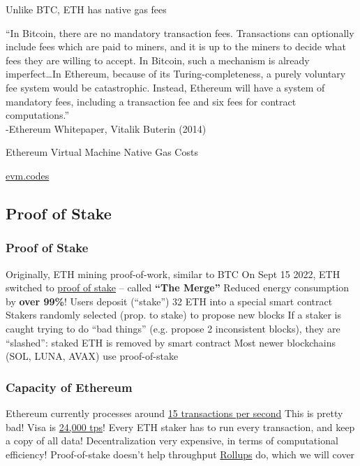 \documentclass[aspectratio=169]{beamer}
\begin{document}
\begin{frame}{Unlike BTC, ETH has native gas fees}

``In Bitcoin, there are no mandatory transaction fees. Transactions can optionally include fees which are paid to miners, and it is up to the miners to decide what fees they are willing to accept. In Bitcoin, such a mechanism is already imperfect\ldots In Ethereum, because of its Turing-completeness, a purely voluntary fee system would be catastrophic. Instead, Ethereum will have a system of mandatory fees, including a transaction fee and six fees for contract computations.'' \\

-Ethereum Whitepaper, Vitalik Buterin (2014)
    
\end{frame}


\begin{frame}{Ethereum Virtual Machine Native Gas Costs}

\vfill
\begin{center}
    \href{https://www.evm.codes/}{evm.codes}
\end{center}
\vfill
    
\end{frame}

\subsection{Proof of Stake}

\begin{frame}
\frametitle{Proof of Stake}

\bi
\m Originally, ETH mining proof-of-work, similar to BTC
\m On Sept 15 2022, ETH switched to \ul{proof of stake} -- called \textbf{``The Merge''}
\m Reduced energy consumption by \textbf{over 99\%}! 
\m Users deposit (``stake'') 32 ETH into a special smart contract
\m Stakers randomly selected (prop. to stake) to propose new blocks
\m If a staker is caught trying to do ``bad things'' (e.g. propose 2 inconsistent blocks), they are ``slashed'': staked ETH is removed by smart contract
\m Most newer blockchains (SOL, LUNA, AVAX) use proof-of-stake
\ei

\end{frame}

\begin{frame}
\frametitle{Capacity of Ethereum}

\bi
\m Ethereum currently processes around \href{https://www.coinbase.com/blog/scaling-ethereum-crypto-for-a-billion-users}{15 transactions per second}
\m This is pretty bad! Visa is \href{https://crypto.com/university/blockchain-scalability}{24,000 tps}!
\bi
\m Every ETH staker has to run every transaction, and keep a copy of all data!
\ei
\m Decentralization very expensive, in terms of computational efficiency!
\m Proof-of-stake doesn't help throughput
\bi 
\m \ul{Rollups} do, which we will cover 
\ei 
\ei

\end{frame}
\end{document}
